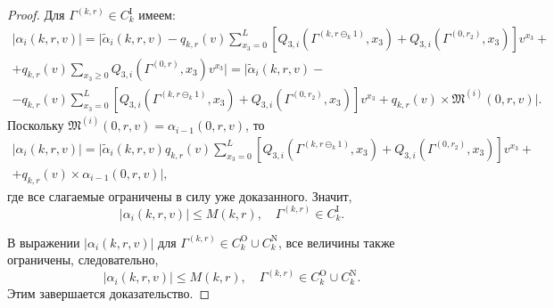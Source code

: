 \documentclass[a4paper,12pt,russian]{extarticle}
\begin{document}
\begin{proof}
Для $\Gamma^{(k, r)} \in C_{k}^{\mathrm{I}}$ имеем:
\begin{multline*}
|\alpha_i(k,r,v) |=|\tilde{\alpha}_i(k,r,v) - q_{k,r}(v)\sum_{x_3=0}^{L} \left[ Q_{3,i}(\Gamma^{(k,r\ominus_k 1)},x_3) + Q_{3,i}(\Gamma^{(0,r_2)},x_3) \right] v^{x_3}+\\  +q_{{k},{r}}(v)  \sum_{x_3\geqslant 0} Q_{3,i}(\Gamma^{(0,{r})},x_3) v^{x_3}| = |\tilde{\alpha}_i(k,r,v)  -\\- q_{k,r}(v) \sum_{x_3=0}^{L} \left[ Q_{3,i}(\Gamma^{(k,r\ominus_k 1)},x_3) + Q_{3,i}(\Gamma^{(0,r_2)},x_3) \right] v^{x_3} + q_{{k},{r}}(v)\times \mathfrak{M}^{(i)}(0,r,v) |.
\end{multline*}
Поскольку $\mathfrak{M}^{(i)}(0,r,v) = \alpha_{i-1}(0,r,v)$, то 
\begin{multline*}
|\alpha_i(k,r,v) |= |\tilde{\alpha}_i(k,r,v)   q_{k,r}(v) \sum_{x_3=0}^{L} \left[ Q_{3,i}(\Gamma^{(k,r\ominus_k 1)},x_3) + Q_{3,i}(\Gamma^{(0,r_2)},x_3) \right] v^{x_3} + \\+q_{{k},{r}}(v)\times \alpha_{i-1}(0,r,v)|,
\end{multline*}
где все слагаемые ограничены в силу уже доказанного. Значит,
\begin{equation*}
|\alpha_i(k,r,v) |\leqslant M(k,r), \quad \Gamma^{(k, r)} \in C_{k}^{\mathrm{I}}.
\end{equation*}

В выражении $|\alpha_i(k,r,v)| $ для $\Gamma^{(k, r)} \in C_{k}^{\mathrm{O}} \cup C_{k}^{\mathrm{N}}$, все величины также ограничены, следовательно,
\begin{equation*}
|\alpha_i(k,r,v) |\leqslant M(k,r), \quad \Gamma^{(k, r)} \in C_{k}^{\mathrm{O}} \cup C_{k}^{\mathrm{N}}.
\end{equation*}
Этим завершается доказательство.

\end{proof}
\end{document}
